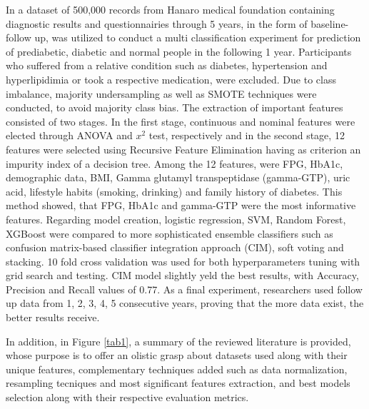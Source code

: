 \documentclass[journal,article,submit,pdftex,moreauthors]{Definitions/mdpi}
\begin{document}
\par In \cite{ijerph18063317} a dataset of 500,000 records from Hanaro medical foundation containing 
diagnostic results and questionnairies through 5 years, in the form of baseline-follow up, was utilized to conduct a multi classification 
experiment for prediction of prediabetic,  diabetic and normal people in the following 1 year.
Participants who suffered from a relative condition such as diabetes, hypertension and hyperlipidimia or took a respective medication,
were excluded. Due to class imbalance, majority undersampling as well as SMOTE techniques were conducted, to avoid majority class
bias. The extraction of important features consisted of two stages. In the first stage, continuous and nominal features
were elected through ANOVA and $x^2$ test, respectively and in the second stage, 12 features were selected using Recursive Feature
Elimination having as criterion an impurity index of a decision tree. Among the 12 features, were FPG, HbA1c, demographic data,
BMI, Gamma glutamyl transpeptidase (gamma-GTP), uric acid, lifestyle habits (smoking, drinking) and family history of diabetes.
This method showed, that FPG, HbA1c and gamma-GTP were the most informative features.
Regarding model creation, logistic regression, SVM, Random Forest, XGBoost were compared to more sophisticated ensemble classifiers
such as confusion matrix-based classifier integration approach (CIM), soft voting and stacking. 10 fold cross validation was used 
for both hyperparameters tuning with grid search and testing. CIM model slightly yeld the best results, with Accuracy, Precision and 
Recall values of 0.77. As a final experiment, researchers used follow up data from 1, 2, 3, 4, 5 consecutive years, proving that
the more data exist, the better results receive.

\par In addition, in Figure \ref{tab1}, a summary of the reviewed literature is provided, whose purpose is to offer an olistic grasp 
about datasets used along with their unique features, complementary techniques added such as data normalization, resampling tecniques
and most significant features extraction, and best models selection along with their respective evaluation metrics.
\end{document}
